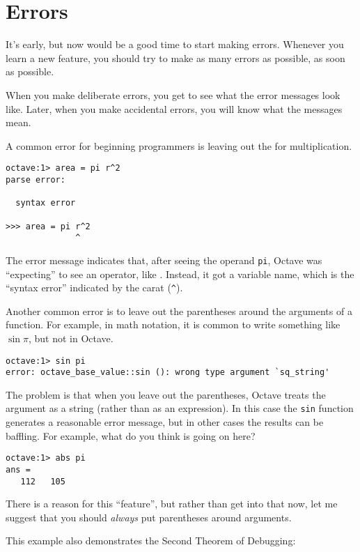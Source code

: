 \section{Errors}

It's early, but now would be a good time to start making errors.
Whenever you learn a new feature, you should try
to make as many errors as possible, as soon as possible.

When you make deliberate errors, you get to see what the error messages
look like. Later, when you make accidental errors, you will know what
the messages mean.

A common error for beginning programmers is leaving out the {\tt *}
for multiplication.

\begin{verbatim}
octave:1> area = pi r^2
parse error:

  syntax error

>>> area = pi r^2
              ^
\end{verbatim}

The error message indicates that, after seeing the operand {\tt pi},
Octave was ``expecting'' to see an operator, like {\tt *}. Instead,
it got a variable name, which is the ``syntax error'' indicated
by the carat (\verb+^+).

Another common error is to leave out the parentheses around the
arguments of a function. For example, in math notation, it is common
to write something like $\sin \pi$, but not in Octave.

\begin{verbatim}
octave:1> sin pi
error: octave_base_value::sin (): wrong type argument `sq_string'
\end{verbatim}

The problem is that when you leave out the parentheses, Octave treats
the argument as a string (rather than as an expression). In
this case the {\tt sin} function generates a reasonable error message,
but in other cases the results can be baffling. For example, what
do you think is going on here?

\begin{verbatim}
octave:1> abs pi
ans =
   112   105
\end{verbatim}

There is a reason for this ``feature'', but rather than get into that
now, let me suggest that you should {\em always} put parentheses around
arguments.

This example also demonstrates the Second Theorem of Debugging:

